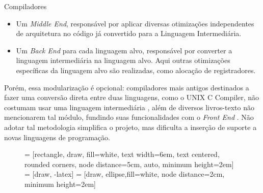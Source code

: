 \begin{section}{Compiladores}
\begin{itemize}
    \item Um \textit{Middle End}, responsável por aplicar diversas otimizações
independentes de arquitetura no código já convertido para a Linguagem Intermediária.

    \item Um \textit{Back End} para cada linguagem alvo, responsável por converter a linguagem intermediária
na linguagem alvo. Aqui outras otimizações específicas da linguagem alvo são realizadas,
como alocação de registradores.

\end{itemize}

Porém, essa modularização é opcional: compiladores mais antigos destinados a fazer uma
conversão direta entre duas linguagens, como o UNIX C Compiler, não costumam usar uma linguagem
intermediária \citep{ritchie1979tour}, além de diversos livros-texto não mencionarem tal módulo, fundindo suas
funcionalidades com o \textit{Front End} \citep{dragonbook}. Não adotar tal metodologia
simplifica o projeto, mas dificulta a inserção de suporte a novas
linguagens de programação.


\begin{figure}
 = [rectangle, draw, fill=white,
    text width=6em, text centered, rounded corners, node distance=5cm, auto, minimum height=2em]
 = [draw, -latex]
 = [draw, ellipse,fill=white, node distance=2cm,
    minimum height=2em]

\begin{center}
\end{center}
\end{figure}
\end{section}
